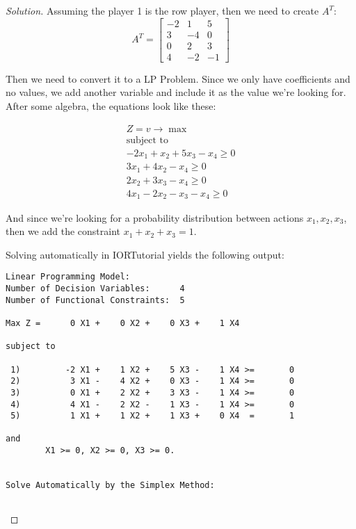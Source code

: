 \documentclass[titlepage, letterpaper, fleqn]{article}
\renewcommand\qedsymbol{\(\blacksquare\)}
\newenvironment{solution}
{\renewcommand\qedsymbol{$\square$}\begin{proof}[Solution]}
{\end{proof}}
\begin{document}
\begin{solution}
Assuming the player 1 is the row player, then we need to create $A^T$:
$$
A^T =
\begin{bmatrix}
-2 & 1 & 5 \\
3 & -4 & 0 \\
0 & 2 & 3 \\
4 & -2 & -1
\end{bmatrix}
$$

Then we need to convert it to a LP Problem.
Since we only have coefficients and no values,
we add another variable and include it as the value we're looking for.
After some algebra, the equations look like these:

\begin{align*}
	Z = v \to \max \\
	\text{subject to} \\
	-2x_1 + x_2 + 5x_3 - x_4 \geq 0 \\
	3x_1 + 4x_2 - x_4 \geq 0 \\
	2x_2 + 3x_3 - x_4 \geq 0 \\
	4x_1 - 2x_2 - x_3 - x_4 \geq 0
\end{align*}

And since we're looking for a probability distribution between actions $x_1, x_2, x_3$, then we add the constraint $x_1 + x_2 + x_3 = 1$.

Solving automatically in IORTutorial yields the following output:

\begin{lstlisting}[basicstyle=\tiny]
Linear Programming Model:
Number of Decision Variables:      4
Number of Functional Constraints:  5

Max Z =      0 X1 +    0 X2 +    0 X3 +    1 X4 

subject to

 1)         -2 X1 +    1 X2 +    5 X3 -    1 X4 >=       0
 2)          3 X1 -    4 X2 +    0 X3 -    1 X4 >=       0
 3)          0 X1 +    2 X2 +    3 X3 -    1 X4 >=       0
 4)          4 X1 -    2 X2 -    1 X3 -    1 X4 >=       0
 5)          1 X1 +    1 X2 +    1 X3 +    0 X4  =       1

and
        X1 >= 0, X2 >= 0, X3 >= 0.


Solve Automatically by the Simplex Method:


\end{lstlisting}
\end{solution}
\end{document}
